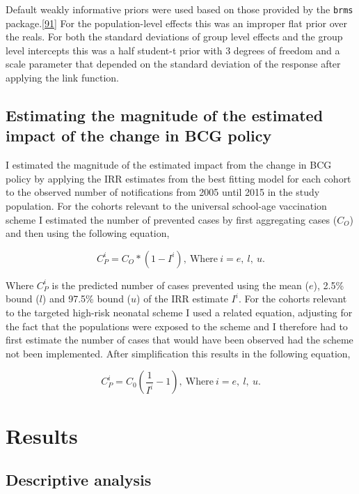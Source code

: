 \documentclass[11pt,twoside]{bristolthesis}
\begin{document}
  Default weakly informative priors were used based on those provided by the \texttt{brms} package.{[}\protect\hyperlink{ref-Burkner}{91}{]} For the population-level effects this was an improper flat prior over the reals. For both the standard deviations of group level effects and the group level intercepts this was a half student-t prior with 3 degrees of freedom and a scale parameter that depended on the standard deviation of the response after applying the link function.
  
  \hypertarget{magnitude-estimation}{%
  \subsection{Estimating the magnitude of the estimated impact of the change in BCG policy}\label{magnitude-estimation}}
  
  I estimated the magnitude of the estimated impact from the change in BCG policy by applying the IRR estimates from the best fitting model for each cohort to the observed number of notifications from 2005 until 2015 in the study population. For the cohorts relevant to the universal school-age vaccination scheme I estimated the number of prevented cases by first aggregating cases (\(C_O\)) and then using the following equation,
  
  \[ C^i_P = C_O * (1 - I^i),\ \text{Where}\ i = e,\ l,\ u.\]
  
  Where \(C^i_P\) is the predicted number of cases prevented using the mean (\(e\)), 2.5\% bound (\(l\)) and 97.5\% bound (\(u\)) of the IRR estimate \(I^i\). For the cohorts relevant to the targeted high-risk neonatal scheme I used a related equation, adjusting for the fact that the populations were exposed to the scheme and I therefore had to first estimate the number of cases that would have been observed had the scheme not been implemented. After simplification this results in the following equation,
  
  \[ C^i_P =  C_0\left(\frac{1}{I^i } - 1\right),\ \text{Where}\ i = e,\ l,\ u.\]
  
  \hypertarget{results-2}{%
  \section{Results}\label{results-2}}
  
  \hypertarget{descriptive-analysis}{%
  \subsection{Descriptive analysis}\label{descriptive-analysis}}
  
\end{document}

